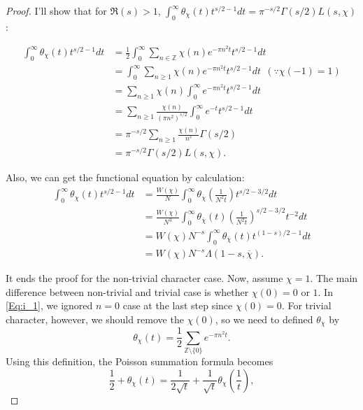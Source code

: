 \documentclass[a4paper, 12pt]{article}
\theoremstyle{Mydefinition}
\theoremstyle{Mytheorem}
\begin{document}
\begin{proof}
I'll show that for $\Re(s)>1$, $\int_0^\infty \theta_\chi(t)t^{s/2-1}dt = \pi^{-s/2}\Gamma(s/2)L(s,\chi)$:


\begin{equation}\label{Eq:i_1}
\begin{split}
    \int_0^\infty \theta_\chi(t)t^{s/2-1}dt &=\frac{1}{2}\int_0^\infty \sum_{n\in\mathbb{Z}}\chi(n) e^{-\pi n^2 t}t^{s/2-1}dt\\
    &=\int_0^\infty \sum_{n\geq 1}\chi(n) e^{-\pi n^2 t}t^{s/2-1}dt~~(\because \chi(-1)=1)\\
    &=\sum_{n\geq 1}\chi(n)\int_0^\infty e^{-\pi n^2 t}t^{s/2-1}dt\\
    &=\sum_{n\geq 1}\frac{\chi(n)}{(\pi n^2)^{s/2}}\int_0^\infty e^{-t}t^{s/2-1}dt\\
    &=\pi^{-s/2}\sum_{n\geq 1}\frac{\chi(n)}{n^s}\Gamma(s/2)\\
    &=\pi^{-s/2}\Gamma(s/2)L(s,\chi).
\end{split}
\end{equation}

Also, we can get the functional equation by calculation:
\begin{equation*}
\begin{split}
    \int_0^\infty \theta_\chi(t)t^{s/2-1}dt &= \frac{W(\chi)}{N}\int_0^\infty \theta_{\overline{\chi}}\left(\frac{1}{N^2 t}\right) t^{s/2-3/2}dt\\
    &=\frac{W(\chi)}{N^3}\int_0^\infty \theta_{\overline{\chi}}(t) \left(\frac{1}{N^2 t}\right)^{s/2-3/2}t^{-2}dt\\
    &=W(\chi)N^{-s}\int_0^\infty \theta_{\overline{\chi}}(t) t^{(1-s)/2-1}dt\\
    &=W(\chi)N^{-s}\Lambda(1-s, \overline{\chi}).
\end{split}
\end{equation*}

It ends the proof for the non-trivial character case. Now, assume $\chi = 1$. The main difference between non-trivial and trivial case is whether $\chi(0) = 0$ or $1$. In \eqref{Eq:i_1}, we ignored $n=0$ case at the last step since $\chi(0) = 0$. For trivial character, however, we should remove the $\chi(0)$, so we need to defined $\theta_\chi$ by
\begin{equation*}
    \theta_\chi(t) = \frac{1}{2}\sum_{\mathbb{Z}\setminus\{0\}} e^{-\pi n^2 t}.
\end{equation*}
Using this definition, the Poisson summation formula becomes
\begin{equation*}
    \frac{1}{2} + \theta_\chi(t) = \frac{1}{2\sqrt{t}} + \frac{1}{\sqrt{t}}\theta_\chi\left(\frac{1}{t}\right),
\end{equation*}


\end{proof}
\end{document}
